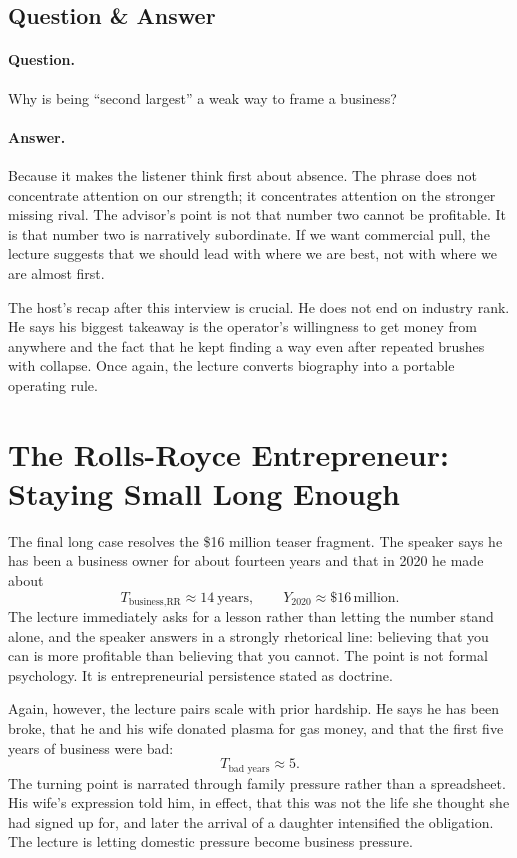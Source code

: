 \subsection{Question \& Answer}

\paragraph{Question.} Why is being ``second largest'' a weak way to frame a business?

\paragraph{Answer.} Because it makes the listener think first about absence. The phrase does not concentrate attention on our strength; it concentrates attention on the stronger missing rival. The advisor's point is not that number two cannot be profitable. It is that number two is narratively subordinate. If we want commercial pull, the lecture suggests that we should lead with where we are best, not with where we are almost first.

The host's recap after this interview is crucial. He does not end on industry rank. He says his biggest takeaway is the operator's willingness to get money from anywhere and the fact that he kept finding a way even after repeated brushes with collapse. Once again, the lecture converts biography into a portable operating rule.

\section{The Rolls-Royce Entrepreneur: Staying Small Long Enough}

The final long case resolves the \$16 million teaser fragment. The speaker says he has been a business owner for about fourteen years and that in 2020 he made about
\begin{equation}
T_{\text{business,RR}} \approx 14\ \text{years},\qquad
Y_{2020} \approx \$16\,\text{million}.
\end{equation}
The lecture immediately asks for a lesson rather than letting the number stand alone, and the speaker answers in a strongly rhetorical line: believing that you can is more profitable than believing that you cannot. The point is not formal psychology. It is entrepreneurial persistence stated as doctrine.

Again, however, the lecture pairs scale with prior hardship. He says he has been broke, that he and his wife donated plasma for gas money, and that the first five years of business were bad:
\begin{equation}
T_{\text{bad years}} \approx 5.
\end{equation}
The turning point is narrated through family pressure rather than a spreadsheet. His wife's expression told him, in effect, that this was not the life she thought she had signed up for, and later the arrival of a daughter intensified the obligation. The lecture is letting domestic pressure become business pressure.

